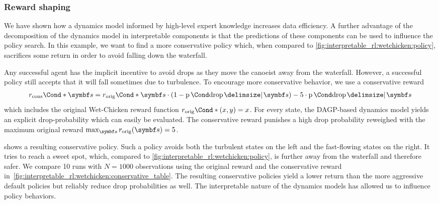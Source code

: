 \subsubsection{Reward shaping}
\label{toc:interpretable_rl:reward_shaping}
We have shown how a dynamics model informed by high-level expert knowledge increases data efficiency.
A further advantage of the decomposition of the dynamics model in interpretable components is that the predictions of these components can be used to influence the policy search.
In this example, we want to find a more conservative policy which, when compared to \cref{fig:interpretable_rl:wetchicken:policy}, sacrifices some return in order to avoid falling down the waterfall.

Any successful agent has the implicit incentive to avoid drops as they move the canoeist away from the waterfall.
However, a successful policy still accepts that it will fall sometimes due to turbulence.
To encourage more conservative behavior, we use a conservative reward
\begin{align}
    \Fun*{r_\text{cons}}{\mat{s}} =
    \Fun*{r_\text{orig}}{\mat{s}} \cdot \left(1 - \Prob{\text{drop} \given \mat{s}}\right)
    - 5 \cdot \Prob{\text{drop} \given \mat{s}}
\end{align}
which includes the original Wet-Chicken reward function $\Fun*{r_\text{orig}}{(x, y)} = x$.
For every state, the DAGP-based dynamics model yields an explicit drop-probability which can easily be evaluated.
The conservative reward punishes a high drop probability reweighed with the maximum original reward $\max_{\mat{s}} r_\text{orig}(\mat{s}) = 5$.

 shows a resulting conservative policy.
Such a policy avoids both the turbulent states on the left and the fast-flowing states on the right.
It tries to reach a sweet spot, which, compared to \cref{fig:interpretable_rl:wetchicken:policy}, is further away from the waterfall and therefore safer.
We compare 10 runs with $N=1000$ observations using the original reward and the conservative reward in~\cref{fig:interpretable_rl:wetchicken:conservative_table}.
The resulting conservative policies yield a lower return than the more aggressive default policies but reliably reduce drop probabilities as well.
The interpretable nature of the dynamics models has allowed us to influence policy behaviors.


